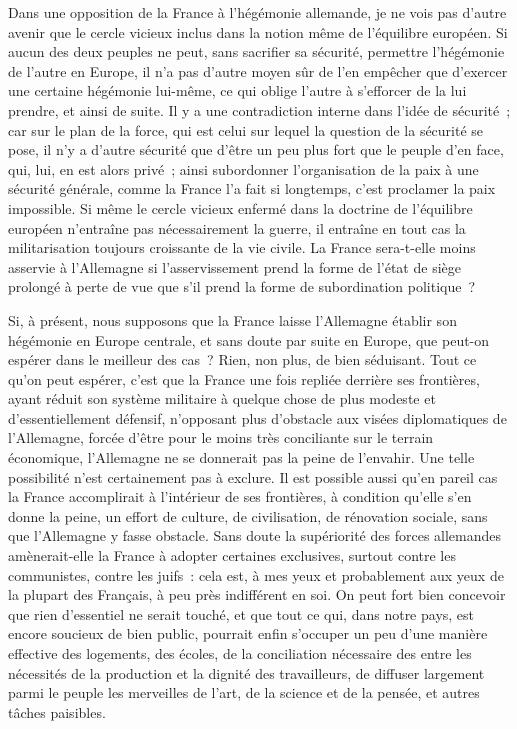 \documentclass[french,twoside]{book} %
\begin{document}
Dans une opposition de la France à l'hégémonie allemande, je ne vois pas d'autre avenir que le cercle vicieux inclus dans la notion même de l'équilibre européen. Si aucun des deux peuples ne peut, sans sacrifier sa sécurité, permettre l'hégémonie de l'autre en Europe, il n'a pas d'autre moyen sûr de l'en empêcher que d'exercer une certaine hégémonie lui-même, ce qui oblige l'autre à s'efforcer de la lui prendre, et ainsi de suite. Il y a une contradiction interne dans l'idée de sécurité ; car sur le plan de la force, qui est celui sur lequel la question de la sécurité se pose, il n'y a d'autre sécurité que d'être un peu plus fort que le peuple d'en face, qui, lui, en est alors privé ; ainsi subordonner l'organisation de la paix à une sécurité générale, comme la France l'a fait si longtemps, c'est proclamer la paix impossible. Si même le cercle vicieux enfermé dans la doctrine de l'équilibre européen n'entraîne pas nécessairement la guerre, il entraîne en tout cas la militarisation toujours croissante de la vie civile. La France sera-t-elle moins asservie à l'Allemagne si l'asservissement prend la forme de l'état de siège prolongé à perte de vue que s'il prend la forme de subordination politique ?\par
Si, à présent, nous supposons que la France laisse l'Allemagne établir son hégémonie en Europe centrale, et sans doute par suite en Europe, que peut-on espérer dans le meilleur des cas ? Rien, non plus, de bien séduisant. Tout ce qu'on peut espérer, c'est que la France une fois repliée derrière ses frontières, ayant réduit son système militaire à quelque chose de plus modeste et d'essentiellement défensif, n'opposant plus d'obstacle aux visées diplomati­ques de l'Allemagne, forcée d'être pour le moins très conciliante sur le terrain économique, l'Allemagne ne se donnerait pas la peine de l'envahir. Une telle possibilité n'est certainement pas à exclure. Il est possible aussi qu'en pareil cas la France accomplirait à l'intérieur de ses frontières, à condition qu'elle s'en donne la peine, un effort de culture, de civilisation, de rénovation sociale, sans que l'Allemagne y fasse obstacle. Sans doute la supériorité des forces allemandes amènerait-elle la France à adopter certaines exclusives, surtout contre les communistes, contre les juifs : cela est, à mes yeux et probablement aux yeux de la plupart des Français, à peu près indifférent en soi. On peut fort bien concevoir que rien d'essentiel ne serait touché, et que tout ce qui, dans notre pays, est encore soucieux de bien public, pourrait enfin s'occuper un peu d'une manière effective des logements, des écoles, de la conciliation néces­saire des entre les nécessités de la production et la dignité des travailleurs, de diffuser largement parmi le peuple les merveilles de l'art, de la science et de la pensée, et autres tâches paisibles.\par
\end{document}
